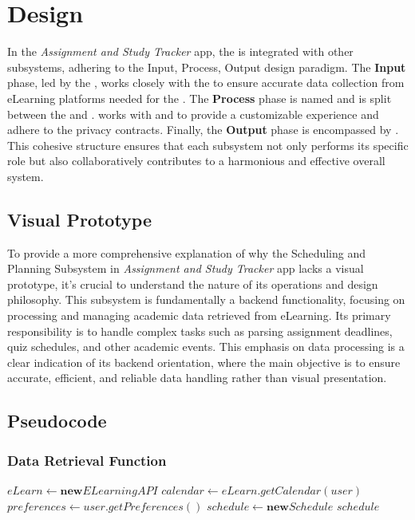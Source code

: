 \documentclass[12pt]{article}
\newcommand\app{\textit{Assignment and Study Tracker} app\xspace}
\begin{document}
\section{Design}
In the \app, the \subsystem is integrated with other subsystems, adhering to the Input, Process, Output design paradigm. The \textbf{Input} phase, led by the \dataRetrieval, works closely with the \dataSubsystem to ensure accurate data collection from eLearning platforms needed for the \scheduler. The \textbf{Process} phase is named \scheduler and is split between the \persoanlizedScheduler and \dynamicScheduler. \persoanlizedScheduler works with \securitySubsystem and \userSubsystem to provide a customizable experience and adhere to the privacy contracts. Finally, the \textbf{Output} phase is encompassed by \userInterface. This cohesive structure ensures that each subsystem not only performs its specific role but also collaboratively contributes to a harmonious and effective overall system.

\subsection{Visual Prototype}
To provide a more comprehensive explanation of why the Scheduling and Planning Subsystem in \app lacks a visual prototype, it's crucial to understand the nature of its operations and design philosophy. This subsystem is fundamentally a backend functionality, focusing on processing and managing academic data retrieved from eLearning. Its primary responsibility is to handle complex tasks such as parsing assignment deadlines, quiz schedules, and other academic events. This emphasis on data processing is a clear indication of its backend orientation, where the main objective is to ensure accurate, efficient, and reliable data handling rather than visual presentation.

\newpage

\subsection{Pseudocode}

\subsubsection{Data Retrieval Function}
\begin{algorithmic}[1] %
    \State $eLearn \gets \textbf{new} ELearningAPI$
    \State $calendar \gets eLearn.getCalendar(user)$
    \State $preferences \gets user.getPreferences()$
    \State $schedule \gets \textbf{new} Schedule$
    \State {}
    \State {}
    \State \Return $schedule$
\EndFunction
\Statex

\end{algorithmic}
\end{document}
